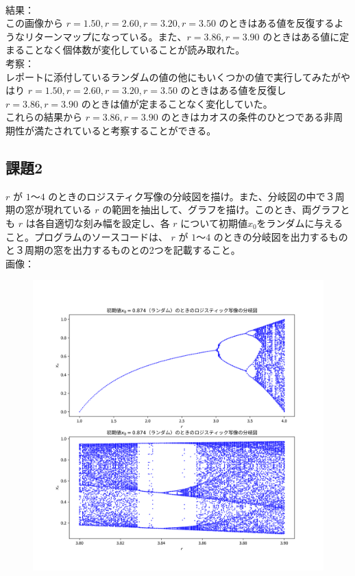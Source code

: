 \\
結果：\\
この画像から $r = 1.50, r = 2.60, r = 3.20, r = 3.50$ のときはある値を反復するようなリターンマップになっている。また、$r = 3.86, r = 3.90$ のときはある値に定まることなく個体数が変化していることが読み取れた。\\
考察：\\
レポートに添付しているランダムの値の他にもいくつかの値で実行してみたがやはり $r = 1.50, r = 2.60, r = 3.20, r = 3.50$ のときはある値を反復し $r = 3.86, r = 3.90$ のときは値が定まることなく変化していた。\\
これらの結果から $r = 3.86, r = 3.90$ のときはカオスの条件のひとつである非周期性が満たされていると考察することができる。


\subsection{課題2}
$r$ が $1～4$ のときのロジスティク写像の分岐図を描け。また、分岐図の中で３周期の窓が現れている $r$ の範囲を抽出して、グラフを描け。このとき、両グラフとも $r$ は各自適切な刻み幅を設定し、各 $r$ について初期値$x_0$をランダムに与えること。プログラムのソースコードは、 $r$ が $1～4$ のときの分岐図を出力するものと３周期の窓を出力するものとの2つを記載すること。\\
画像：\\
\begin{figure}[htbp]
  \centering
  \includegraphics[keepaspectratio, scale=0.5]{images/Problem3/ctest4.png}
\end{figure}
